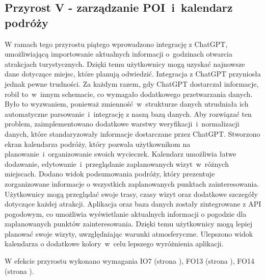     \subsection{Przyrost V - zarządzanie POI~i~kalendarz podróży}
    \label{sec:przyrost5}

    W ramach tego przyrostu piątego wprowadzono integrację z ChatGPT, umożliwiającą importowanie aktualnych informacji o~godzinach otwarcia atrakcjach turystycznych. 
    Dzięki temu użytkownicy mogą uzyskać najnowsze dane dotyczące miejsc, które planują odwiedzić.\newline
    \indent Integracja z ChatGPT przyniosła jednak pewne trudności. Za każdym razem, gdy ChatGPT dostarczał informacje, robił to~w~innym schemacie, 
    co wymagało dodatkowego przetwarzania danych. Było to wyzwaniem, ponieważ zmienność~w~strukturze danych utrudniała ich automatyczne parsowanie~i~integrację z naszą bazą danych. \newline 
    \indent Aby rozwiązać ten problem, zaimplementowano dodatkowe warstwy weryfikacji~i~normalizacji danych, które standaryzowały informacje dostarczane przez ChatGPT.\newline
    \indent Stworzono ekran kalendarza podróży, który pozwala użytkownikom na planowanie~i~organizowanie swoich wycieczek.
    Kalendarz umożliwia łatwe dodawanie, edytowanie~i~przeglądanie zaplanowanych wizyt~w~różnych miejscach.\newline
    \indent Dodano widok podsumowania podróży, który prezentuje zorganizowane informacje o wszystkich zaplanowanych punktach zainteresowania. 
    Użytkownicy mogą przeglądać swoje trasy, czasy wizyt oraz dodatkowe szczegóły dotyczące każdej atrakcji. \newline
    \indent Aplikacja oraz baza danych zostały zintegrowane z API pogodowym, co umożliwia wyświetlanie aktualnych informacji o pogodzie dla zaplanowanych punktów zainteresowania. 
    Dzięki temu użytkownicy mogą lepiej planować swoje wizyty, uwzględniając warunki atmosferyczne. \newline
    Ulepszono widok kalendarza o dodatkowe kolory~w~celu lepszego wyróżnienia aplikacji. 

    W efekcie przyrostu wykonano wymagania IO7 (strona \pageref{tab:requirements:env7}), FO13 (strona \pageref{tab:requirements:func13}), FO14 (strona \pageref{tab:requirements:func14}).

